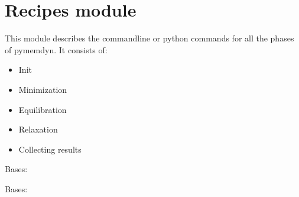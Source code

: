 \documentclass[letterpaper,10pt,english]{sphinxmanual}
\begin{document}
\sphinxstepscope


\section{Recipes module}
\label{\detokenize{recipes:module-recipes}}\label{\detokenize{recipes:recipes-module}}\label{\detokenize{recipes::doc}}
\sphinxAtStartPar
This module describes the commandline or python commands for all the 
phases of pymemdyn. It consists of:
\begin{itemize}
\item {} 
\sphinxAtStartPar
Init

\item {} 
\sphinxAtStartPar
Minimization

\item {} 
\sphinxAtStartPar
Equilibration

\item {} 
\sphinxAtStartPar
Relaxation

\item {} 
\sphinxAtStartPar
Collecting results

\end{itemize}

\begin{fulllineitems}
\label{\detokenize{recipes:recipes.BasicInit}}
\pysigstartsignatures
{}
\pysigstopsignatures
\sphinxAtStartPar
Bases: 

\end{fulllineitems}


\begin{fulllineitems}
\label{\detokenize{recipes:recipes.LigandInit}}
\pysigstartsignatures
{}
\pysigstopsignatures
\sphinxAtStartPar
Bases: {\hyperref[\detokenize{recipes:recipes.BasicInit}]{}}

\end{fulllineitems}
\end{document}
